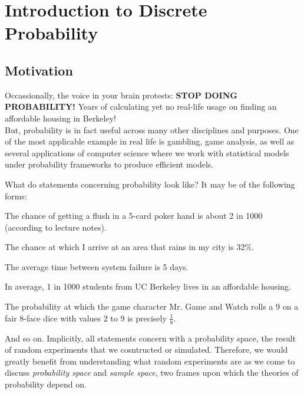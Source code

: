 \chapter{Introduction to Discrete Probability}

\section{Motivation}
Occassionally, the voice in your brain protests: \textbf{STOP DOING PROBABILITY!} Years of calculating yet no real-life usage on finding an affordable housing in Berkeley! \\
But, probability is in fact useful across many other disciplines and purposes. One of the most applicable example in real life is gambling, game analysis, as well as several applications of computer science where we work with statistical models under probability frameworks to produce efficient models.

What do statements concerning probability look like? It may be of the following forms:
\begin{bindenum}
    \item The chance of getting a flush in a 5-card poker hand is about 2 in 1000 (according to lecture notes).
    \item The chance at which I arrive at an area that rains in my city is 32\%.
    \item The average time between system failure is 5 days.
    \item In average, 1 in 1000 students from UC Berkeley lives in an affordable housing.
    \item The probability at which the game character Mr. Game and Watch rolls a 9 on a fair 8-face dice with values 2 to 9 is precisely $\frac{1}{8}$.
\end{bindenum}
And so on. Implicitly, all statements concern with a probability space, the result of random experiments that we cosntructed or simulated. Therefore, we would greatly benefit from understanding what random experiments are as we come to discuss \textit{probability space} and \textit{sample space}, two frames upon which the theories of probability depend on.

